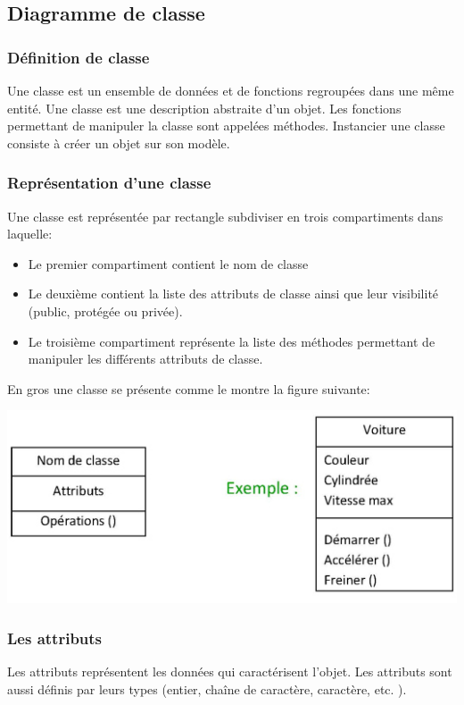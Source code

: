 		\subsection{Diagramme de classe}
			\subsubsection{Définition de classe}
				Une classe est un ensemble de données et de fonctions regroupées dans une même entité. Une classe est une description abstraite d'un objet. Les fonctions permettant de manipuler la classe sont appelées méthodes. Instancier une classe consiste à créer un objet sur son modèle.
			\subsubsection{Représentation d'une classe}
				Une classe est représentée par rectangle subdiviser en trois compartiments dans laquelle:
				\begin{itemize}
					\item Le premier compartiment contient le nom de classe
					\item Le deuxième contient la liste des attributs de classe ainsi que leur visibilité (public, protégée ou privée).
					\item Le troisième compartiment représente la liste des méthodes permettant de manipuler les différents attributs de classe.
				\end{itemize}
			En gros une classe se présente comme le montre la figure suivante:
			\begin{center}
				\includegraphics{images/img-1.jpg}\cite{image_classe_voiture}
				\label{figure1}
			\end{center}
			\subsubsection{Les attributs}
				Les attributs représentent les données qui caractérisent l'objet. Les attributs sont aussi définis par leurs types (entier, chaîne de caractère, caractère, etc. ).
